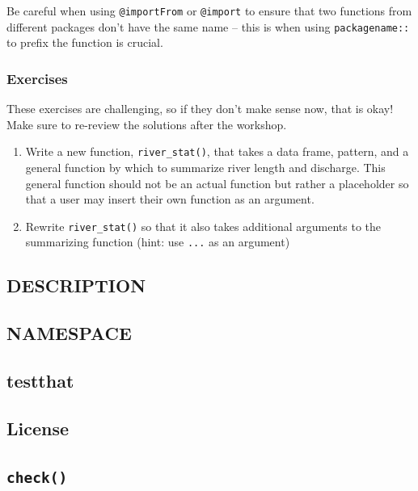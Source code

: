 \documentclass[
]{book}
\begin{document}
Be careful when using \texttt{@importFrom} or \texttt{@import} to ensure that two functions from different packages don't have the same name -- this is when using \texttt{packagename::} to prefix the function is crucial.

\hypertarget{exercises-2}{%
\subsubsection{Exercises}\label{exercises-2}}

These exercises are challenging, so if they don't make sense now, that is okay! Make sure to re-review the solutions after the workshop.

\begin{enumerate}
\def\labelenumi{\arabic{enumi}.}
\item
  Write a new function, \texttt{river\_stat()}, that takes a data frame, pattern, and a general function by which to summarize river length and discharge. This general function should not be an actual function but rather a placeholder so that a user may insert their own function as an argument.
\item
  Rewrite \texttt{river\_stat()} so that it also takes additional arguments to the summarizing function (hint: use \texttt{...} as an argument)
\end{enumerate}

\hypertarget{description}{%
\subsection{DESCRIPTION}\label{description}}

\hypertarget{namespace}{%
\subsection{NAMESPACE}\label{namespace}}

\hypertarget{testthat}{%
\subsection{testthat}\label{testthat}}

\hypertarget{license}{%
\subsection{License}\label{license}}

\hypertarget{check}{%
\subsection{\texorpdfstring{\texttt{check()}}{check()}}\label{check}}
\end{document}
